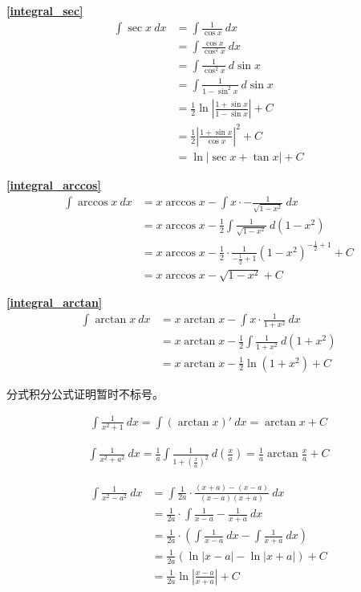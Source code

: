 \textbf{\large \ref{integral_sec}}
\begin{align*}
        \int \sec x\ dx&=\int \frac{1}{\cos x}\ dx\\
        &=\int \frac{\cos x}{\cos^2x}\ dx\\
        &=\int \frac{1}{\cos^2x}\ d\sin x\\
        &=\int \frac{1}{1-\sin^2 x}\ d\sin x\\
        &=\frac{1}{2}\ln\left|\frac{1+\sin x}{1-\sin x}\right|+C\\
        &=\frac{1}{2}\left|\frac{1+\sin x}{\cos x}\right|^2+C\\
        &=\ln\left|\sec x+\tan x\right|+C
\end{align*}

\textbf{\large \ref{integral_arccos}}
\begin{align*}
        \int \arccos x\ dx&= x\arccos x-\int x \cdot-\frac{1}{\sqrt{1-x^2}}\ dx\\
        &= x\arccos x-\frac{1}{2}\int  \frac{1}{\sqrt{1-x^2}}\ d(1-x^2)\\
        &= x\arccos x-\frac{1}{2}\cdot\frac{1}{-\frac{1}{2}+1} (1-x^2)^{-\frac{1}{2}+1}+C \\
        &= x\arccos x-\sqrt{1-x^2} +C
\end{align*}

\textbf{\large \ref{integral_arctan}}
\begin{align*}
        \int \arctan x\ dx&= x\arctan x-\int x \cdot\frac{1}{1+x^2}\ dx\\
        &= x\arctan x-\frac{1}{2}\int \frac{1}{1+x^2}\ d(1+x^2)\\
        &= x\arctan x-\frac{1}{2}\ln (1+x^2)+C 
\end{align*}

\centerline{分式积分公式证明暂时不标号。}
\begin{align*}
    \int \frac{1}{x^2+1}\ dx=\int (\arctan x)'\ dx=\arctan x+C
\end{align*}

\begin{align*}
        \int \frac{1}{x^2+a^2}\ dx=\frac{1}{a}\int \frac{1}{1+(\frac{x}{a})^2}\ d(\frac{x}{a})=\frac{1}{a}\arctan \frac{x}{a}+C
\end{align*}

\begin{align*}
        \int \frac{1}{x^2-a^2}\ dx&=\int \frac{1}{2a}\cdot\frac{(x+a)-(x-a)}{(x-a)(x+a)}\ dx\\
        &=\frac{1}{2a}\cdot\int \frac{1}{x-a}-\frac{1}{x+a}\ dx\\
        &=\frac{1}{2a}\cdot\left(\int \frac{1}{x-a} \ dx-\int\frac{1}{x+a} \ dx\right)\\
        &=\frac{1}{2a}\left(\ln \left|x-a\right|-\ln\left|x+a\right|\right) +C\\
        &=\frac{1}{2a}\ln\left|\frac{x-a}{x+a}\right|+C
\end{align*}

